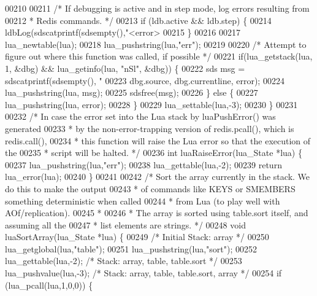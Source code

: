 \begin{DoxyCode}
00210 
00211     \textcolor{comment}{/* If debugging is active and in step mode, log errors resulting from}
00212 \textcolor{comment}{     * Redis commands. */}
00213     \textcolor{keywordflow}{if} (ldb.active && ldb.step) \{
00214         ldbLog(sdscatprintf(sdsempty(),\textcolor{stringliteral}{"<error> %
00215     \}
00216 
00217     lua\_newtable(lua);
00218     lua\_pushstring(lua,\textcolor{stringliteral}{"err"});
00219 
00220     \textcolor{comment}{/* Attempt to figure out where this function was called, if possible */}
00221     \textcolor{keywordflow}{if}(lua\_getstack(lua, 1, &dbg) && lua\_getinfo(lua, \textcolor{stringliteral}{"nSl"}, &dbg)) \{
00222         sds msg = sdscatprintf(sdsempty(), \textcolor{stringliteral}{"%
00223             dbg.source, dbg.currentline, error);
00224         lua\_pushstring(lua, msg);
00225         sdsfree(msg);
00226     \} \textcolor{keywordflow}{else} \{
00227         lua\_pushstring(lua, error);
00228     \}
00229     lua\_settable(lua,-3);
00230 \}
00231 
00232 \textcolor{comment}{/* In case the error set into the Lua stack by luaPushError() was generated}
00233 \textcolor{comment}{ * by the non-error-trapping version of redis.pcall(), which is redis.call(),}
00234 \textcolor{comment}{ * this function will raise the Lua error so that the execution of the}
00235 \textcolor{comment}{ * script will be halted. */}
00236 \textcolor{keywordtype}{int} luaRaiseError(lua\_State *lua) \{
00237     lua\_pushstring(lua,\textcolor{stringliteral}{"err"});
00238     lua\_gettable(lua,-2);
00239     \textcolor{keywordflow}{return} lua\_error(lua);
00240 \}
00241 
00242 \textcolor{comment}{/* Sort the array currently in the stack. We do this to make the output}
00243 \textcolor{comment}{ * of commands like KEYS or SMEMBERS something deterministic when called}
00244 \textcolor{comment}{ * from Lua (to play well with AOf/replication).}
00245 \textcolor{comment}{ *}
00246 \textcolor{comment}{ * The array is sorted using table.sort itself, and assuming all the}
00247 \textcolor{comment}{ * list elements are strings. */}
00248 \textcolor{keywordtype}{void} luaSortArray(lua\_State *lua) \{
00249     \textcolor{comment}{/* Initial Stack: array */}
00250     lua\_getglobal(lua,\textcolor{stringliteral}{"table"});
00251     lua\_pushstring(lua,\textcolor{stringliteral}{"sort"});
00252     lua\_gettable(lua,-2);       \textcolor{comment}{/* Stack: array, table, table.sort */}
00253     lua\_pushvalue(lua,-3);      \textcolor{comment}{/* Stack: array, table, table.sort, array */}
00254     \textcolor{keywordflow}{if} (lua\_pcall(lua,1,0,0)) \{
}}
\end{DoxyCode}
